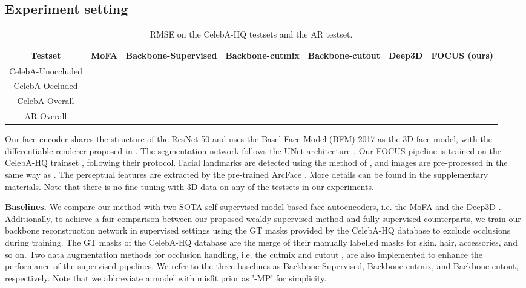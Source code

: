 \documentclass[10pt,twocolumn,letterpaper]{article}
\begin{document}
\subsection{Experiment setting}

\begin{table*}
  \caption{RMSE on the CelebA-HQ testsets and the AR testset.}
  \label{RMSE-fitting accuracy}
  \centering
 \footnotesize
  \renewcommand{\arraystretch}{0.95}
  \setlength{\abovecaptionskip}{1mm}
  \setlength{\belowcaptionskip}{1mm}
 {
  \begin{tabular}{c|cccccc}
  \hline
    Testset & MoFA \cite{tewari2017mofa}     & Backbone-Supervised  & Backbone-cutmix & Backbone-cutout & Deep3D \cite{deng2019accurate}  & FOCUS (ours)  \\
\hline
    CelebA-Unoccluded&   &  &  &  &   & \bm{}\\
    CelebA-Occluded  &   &  &  &  &   & \bm{}\\
    CelebA-Overall   &   &  &  &  &   & \bm{}\\
    AR-Overall       &   &  &  &  &   & \bm{}\\

  \end{tabular}
 }
\end{table*}


Our face encoder shares the structure of the ResNet 50 \cite{he2016deep} and uses the Basel Face Model (BFM) 2017 \cite{gerig2018morphable} as the 3D face model, with the differentiable renderer proposed in \cite{koizumi2020look}. The segmentation network follows the UNet architecture \cite{ronneberger2015u}. Our FOCUS pipeline is trained on the CelebA-HQ trainset \cite{CELEBAHQ}, following their protocol. Facial landmarks are detected using the method of \cite{bulat2017far}, and images are pre-processed in the same way as \cite{deng2019accurate}. The perceptual features are extracted by the pre-trained ArcFace \cite{deng2019arcface}.
More details can be found in the supplementary materials. Note that there is no fine-tuning with 3D data on any of the testsets in our experiments.




\textbf{Baselines.} We compare our method with two SOTA self-supervised model-based face autoencoders, i.e. the MoFA \cite{tewari2017mofa} and the Deep3D \cite{deng2019accurate}. Additionally, to achieve a fair comparison between our proposed weakly-supervised method and fully-supervised counterparts, we train our backbone reconstruction network in supervised settings using the GT masks provided by the CelebA-HQ database to exclude occlusions during training. The GT masks of the CelebA-HQ database are the merge of their manually labelled masks for skin, hair, accessories, and so on. Two data augmentation methods for occlusion handling, i.e. the cutmix \cite{yun2019cutmix} and cutout \cite{devries2017improved}, are also implemented to enhance the performance of the supervised pipelines. We refer to the three baselines as Backbone-Supervised, Backbone-cutmix, and Backbone-cutout, respectively. Note that we abbreviate a model with misfit prior as '-MP' 
for simplicity.
\end{document}
